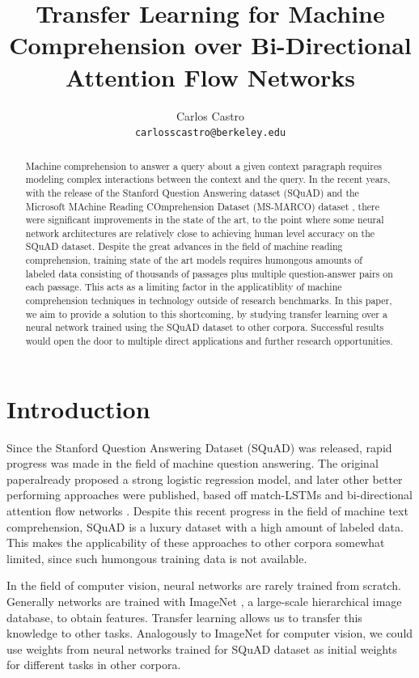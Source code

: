 \documentclass[11pt,a4paper]{article}
\title{Transfer Learning for Machine Comprehension over Bi-Directional Attention Flow Networks}
\author{Carlos Castro \\
  {\tt carlosscastro@berkeley.edu} }
\date{}
\begin{document}
\maketitle
\begin{abstract}

Machine comprehension to answer a query about a given context paragraph requires modeling complex interactions between the context and the query. In the recent years, with the release of the  Stanford Question Answering dataset (SQuAD) \cite{squad:2016} and the Microsoft MAchine Reading COmprehension Dataset (MS-MARCO) dataset \cite{msmarco:2016}, there were significant improvements in the state of the art, to the point where some neural network architectures are relatively close to achieving human level accuracy on the SQuAD dataset. Despite the great advances in the field of machine reading comprehension, training state of the art models requires humongous amounts of labeled data consisting of thousands of passages plus multiple question-answer pairs on each passage. This acts as a limiting factor in the applicatiblity of machine comprehension techniques in technology outside of research benchmarks. In this paper, we aim to provide a solution to this shortcoming, by studying transfer learning over a neural network trained using the SQuAD dataset to other corpora. Successful results would open the door to multiple direct applications and further research opportunities.

\end{abstract}


\section{Introduction}

Since the Stanford Question Answering Dataset (SQuAD) \cite{squad:2016} was released, rapid progress was made in the field of machine question answering. The original paperalready proposed a strong logistic regression model, and later other better performing approaches were published, based off match-LSTMs \cite{matchlstm} and bi-directional attention flow networks \cite{bidaf:2017}. Despite this recent progress in the field of machine text comprehension, SQuAD is a luxury dataset with a high amount of labeled data. This makes the applicability of these approaches to other corpora somewhat limited, since such humongous training data is not available. 

In the field of computer vision, neural networks are rarely trained from scratch. Generally networks are trained with ImageNet \cite{imagenet}, a large-scale hierarchical image database, to obtain features. Transfer learning allows us to transfer this knowledge to other tasks. Analogously to ImageNet for computer vision, we could use weights from neural networks trained for SQuAD dataset as initial weights for different tasks in other corpora. 
\end{document}
